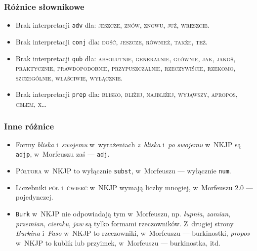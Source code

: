\documentclass[xcolor=dvipsnames,polish]{beamer}
\begin{document}
\begin{frame}
  \frametitle{Różnice słownikowe}

\begin{itemize}
\item Brak interpretacji \texttt{adv} dla: \textsc{jeszcze}, \textsc{znów},
\textsc{znowu}, \textsc{już}, \textsc{wreszcie}.

\medskip

\item Brak interpretacji \texttt{conj} dla: \textsc{dość}, \textsc{jeszcze}, \textsc{również}, \textsc{także}, \textsc{też}.

\medskip

\item Brak interpretacji \texttt{qub} dla: \textsc{absolutnie}, \textsc{generalnie}, \textsc{głównie},
\textsc{jak}, \textsc{jakoś}, \textsc{praktycznie}, \textsc{prawdopodobnie}, \textsc{przypuszczalnie},
\textsc{rzeczywiście}, \textsc{rzekomo}, \textsc{szczególnie}, \textsc{właściwie}, \textsc{wyłącznie}.

\medskip

\item Brak interpretacji \texttt{prep} dla: \textsc{blisko},
\textsc{bliżej}, \textsc{najbliżej}, \textsc{wyjąwszy},
\textsc{apropos}, \textsc{celem}, \textsc{x}…
\end{itemize}
\end{frame}

\begin{frame}
  \frametitle{Inne różnice}

  \begin{itemize}
  \item Formy
    \emph{bliska} i~\emph{swojemu} w~wyrażeniach \emph{z~bliska}
    i~\emph{po swojemu} w~NKJP są \texttt{adjp}, w~Morfeuszu zaś --- \texttt{adj}.
  \item \textsc{Półtora} w~NKJP to wyłącznie \texttt{subst},
    w~Morfeuszu --- wyłącznie \texttt{num}.
  \item Liczebniki \textsc{pół} i~\textsc{ćwierć} w~NKJP wymają liczby
    mnogiej, w~Morfeuszu 2.0 --- pojedynczej.
  \item \texttt{Burk} w~NKJP nie odpowiadają tym w~Morfeuszu,
    np. \emph{łupnia}, \emph{zamian}, \emph{przemian}, \emph{ciemku},
    \emph{jaw} są tylko formami rzeczowników. Z~drugiej strony
    \emph{Burkina} i~\emph{Faso} w~NKJP to rzeczowniki, w~Morfeuszu
    --- burkinostki, \emph{propos} w~NKJP to kublik lub przyimek,
    w~Morfeuszu --- burkinostka, itd.
  \end{itemize}


\end{frame}
\end{document}
